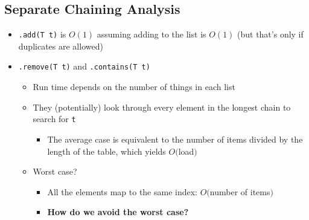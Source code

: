 \documentclass[10pt]{article}
\begin{document}
\subsection*{Separate Chaining Analysis}
\begin{itemize}
    \item \texttt{.add(T t)} is $O(1)$ assuming adding to the list is $O(1)$ (but that's only if duplicates are allowed)
    \item \texttt{.remove(T t)} and \texttt{.contains(T t)}
    \begin{itemize}
        \item Run time depends on the number of things in each list
        \item They (potentially) look through every element in the longest chain to search for \texttt{t}
        \begin{itemize}
            \item The average case is equivalent to the number of items divided by the length of the table, which yields $O($load$)$
        \end{itemize}
        \item Worst case?
        \begin{itemize}
            \item All the elements map to the same index: $O($number of items$)$
            \item \textbf{How do we avoid the worst case?}
        \end{itemize}
    \end{itemize}
\end{itemize}
\end{document}
